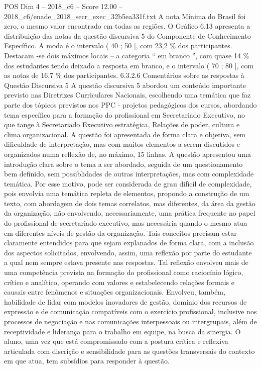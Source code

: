 \begin{textsample}{POS Dim 4 – 2018\_c6 – Score 12.00 – 2018\_c6/enade\_2018\_secr\_exec\_32b5ea331f.txt}
A nota Mínima do Brasil foi zero, o mesmo valor encontrado em todas as regiões.
O Gráfico 6.13 apresenta a distribuição das notas da questão discursiva 5 do Componente de Conhecimento Específico.
A moda é o intervalo ( 40 ; 50 ], com 23,2 \% dos participantes.
Destacam -se dois máximos locais – a categoria “ em branco ”, com quase 14 \% dos estudantes tendo deixado a resposta em branco, e o intervalo ( 70 ; 80 ], com as notas de 16,7 \% dos participantes. 6.3.2.6 Comentários sobre as respostas à Questão Discursiva 5 A questão discursiva 5 abordou um conteúdo importante previsto nas Diretrizes Curriculares Nacionais, escolhendo uma temática que faz parte dos tópicos previstos nos PPC - projetos pedagógicos dos cursos, abordando tema específico para a formação do profissional em Secretariado Executivo, no que tange à Secretariado Executivo estratégica, Relações de poder, cultura e clima organizacional.
A questão foi apresentada de forma clara e objetiva, sem dificuldade de interpretação, mas com muitos elementos a serem discutidos e organizados numa reflexão de, no máximo, 15 linhas.
A questão apresentou uma introdução clara sobre o tema a ser abordado, seguida de um questionamento bem definido, sem possiblidades de outras interpretações, mas com complexidade temática.
Por esse motivo, pode ser considerada de grau difícil de complexidade, pois envolvia uma temática repleta de elementos, propondo a construção de um texto, com abordagem de dois temas correlatos, mas diferentes, da área da gestão da organização, não envolvendo, necessariamente, uma prática frequente no papel do profissional de secretariado executivo, mas necessária quando o mesmo atua em diferentes níveis de gestão da organização.
Tais conceitos precisam estar claramente entendidos para que sejam explanados de forma clara, com a inclusão dos aspectos solicitados, envolvendo, assim, uma reflexão por parte do estudante a qual nem sempre estava presente nas respostas.
Tal reflexão envolveu mais de uma competência prevista na formação do profissional como raciocínio lógico, crítico e analítico, operando com valores e estabelecendo relações formais e causais entre fenômenos e situações organizacionais.
Envolveu, também, habilidade de lidar com modelos inovadores de gestão, domínio dos recursos de expressão e de comunicação compatíveis com o exercício profissional, inclusive nos processos de negociação e nas comunicações interpessoais ou intergrupais, além de receptividade e liderança para o trabalho em equipe, na busca da sinergia.
O aluno, uma vez que está compromissado com a postura crítica e reflexiva articulada com discrição e sensibilidade para as questões transversais do contexto em que atua, tem subsídios para responder à questão.

\end{textsample}
